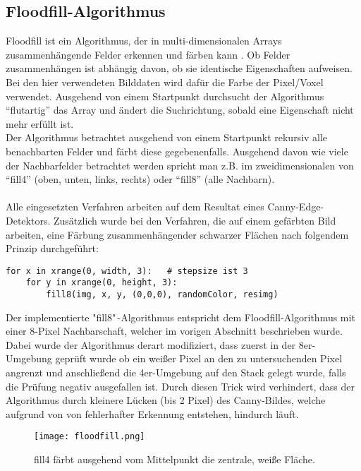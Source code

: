 	\subsection {Floodfill-Algorithmus}
Floodfill ist ein Algorithmus, der in multi-dimensionalen Arrays zusammenhängende Felder erkennen und färben kann \cite{WikiFF}. Ob Felder zusammenhängen ist abhängig davon, ob sie identische Eigenschaften aufweisen. Bei den hier verwendeten Bilddaten wird dafür die Farbe der Pixel/Voxel verwendet. Ausgehend von einem Startpunkt durchsucht der Algorithmus “flutartig” das Array und ändert die Suchrichtung, sobald eine Eigenschaft nicht mehr erfüllt ist. \\
Der Algorithmus betrachtet ausgehend von einem Startpunkt rekursiv alle benachbarten Felder und färbt diese gegebenenfalls. Ausgehend davon wie viele der Nachbarfelder betrachtet werden spricht man z.B. im zweidimensionalen von “fill4” (oben, unten, links, rechts) oder “fill8” (alle Nachbarn). \\ \\
Alle eingesetzten Verfahren arbeiten auf dem Resultat eines Canny-Edge-Detektors. Zusätzlich wurde bei den Verfahren, die auf einem gefärbten Bild arbeiten, eine Färbung zusammenhängender schwarzer Flächen nach folgendem Prinzip durchgeführt: \\

\begin{lstlisting}
for x in xrange(0, width, 3):   # stepsize ist 3
	for y in xrange(0, height, 3):
		fill8(img, x, y, (0,0,0), randomColor, resimg)
\end{lstlisting}

Der implementierte "fill8"\,-Algorithmus entspricht dem Floodfill-Algorithmus mit einer 8-Pixel Nachbarschaft, welcher im vorigen Abschnitt beschrieben wurde. Dabei wurde der Algorithmus derart modifiziert, dass zuerst in der 8er-Umgebung geprüft wurde ob ein weißer Pixel an den zu untersuchenden Pixel angrenzt und anschließend die 4er-Umgebung auf den Stack gelegt wurde, falls die Prüfung negativ ausgefallen ist. Durch diesen Trick wird verhindert, dass der Algorithmus durch kleinere Lücken (bis 2 Pixel) des Canny-Bildes, welche aufgrund von von fehlerhafter Erkennung entstehen, hindurch läuft.

\begin{figure}[H]
  \begin{center}
    \texttt{[image: floodfill.png]}
    \caption{fill4 färbt ausgehend vom Mittelpunkt die zentrale, weiße Fläche.}
    \label{fig:floodfill}
  \end{center}
\end{figure}

